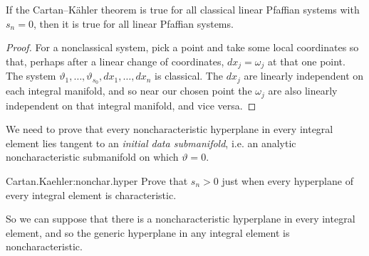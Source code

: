 \begin{lemma}\label{lemma:classy}
If the Cartan--K\"ahler theorem is true for all classical linear Pfaffian systems with \(s_n=0\), then it is true for all linear Pfaffian systems.
\end{lemma}
\begin{proof}
For a nonclassical system, pick a point and take some local coordinates so that, perhaps after a linear change of coordinates, \(dx_j=\omega_j\) at that one point.
The system \(\vartheta_1,\dots,\vartheta_{s_0},dx_1,\dots,dx_n\) is classical.
The \(dx_j\) are linearly independent on each integral manifold, and so near our chosen point the \(\omega_j\) are also linearly independent on that integral manifold, and vice versa.
\end{proof}


We need to prove that every noncharacteristic hyperplane in every integral element lies tangent to an \emph{initial data submanifold}, i.e. an analytic noncharacteristic submanifold on which \(\vartheta=0\).
\begin{problem}{Cartan.Kaehler:nonchar.hyper}
Prove that \(s_n>0\) just when every hyperplane of every integral element is characteristic.
\end{problem}
So we can suppose that there is a noncharacteristic hyperplane in every integral element, and so the generic hyperplane in any integral element is noncharacteristic.

